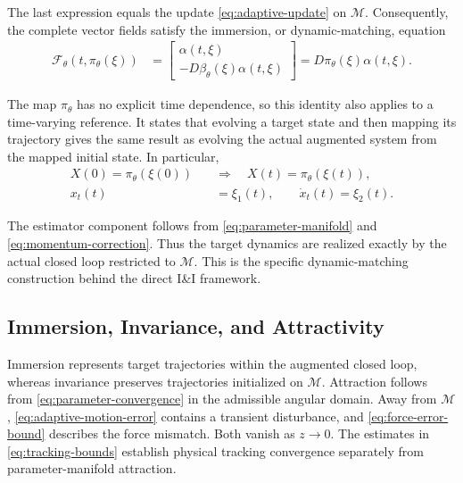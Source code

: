 \documentclass[10pt,journal,letterpaper]{IEEEtran}
\begin{document}
The last expression equals the update \eqref{eq:adaptive-update} on $\mathcal M$. Consequently, the complete vector fields satisfy the immersion, or dynamic-matching, equation
\begin{align*}
\mathcal F_\theta(t,\pi_\theta(\xi))
&=\begin{bmatrix}
\alpha(t,\xi)\\
-D\beta_\theta(\xi)\alpha(t,\xi)
\end{bmatrix}
=D\pi_\theta(\xi)\alpha(t,\xi).
\end{align*}

The map $\pi_\theta$ has no explicit time dependence, so this identity also applies to a time-varying reference. It states that evolving a target state and then mapping its trajectory gives the same result as evolving the actual augmented system from the mapped initial state. In particular,
\begin{align*}
X(0)=\pi_\theta(\xi(0))
\quad&\Longrightarrow\quad
X(t)=\pi_\theta(\xi(t)),\\
x_t(t)&=\xi_1(t),\qquad \dot x_t(t)=\xi_2(t).
\end{align*}

The estimator component follows from \eqref{eq:parameter-manifold} and \eqref{eq:momentum-correction}. Thus the target dynamics are realized exactly by the actual closed loop restricted to $\mathcal M$. This is the specific dynamic-matching construction behind the direct I\&I framework.

\subsection{Immersion, Invariance, and Attractivity}

Immersion represents target trajectories within the augmented closed loop, whereas invariance preserves trajectories initialized on $\mathcal M$. Attraction follows from \eqref{eq:parameter-convergence} in the admissible angular domain. Away from $\mathcal M$, \eqref{eq:adaptive-motion-error} contains a transient disturbance, and \eqref{eq:force-error-bound} describes the force mismatch. Both vanish as $z\to0$. The estimates in \eqref{eq:tracking-bounds} establish physical tracking convergence separately from parameter-manifold attraction.



\end{document}
